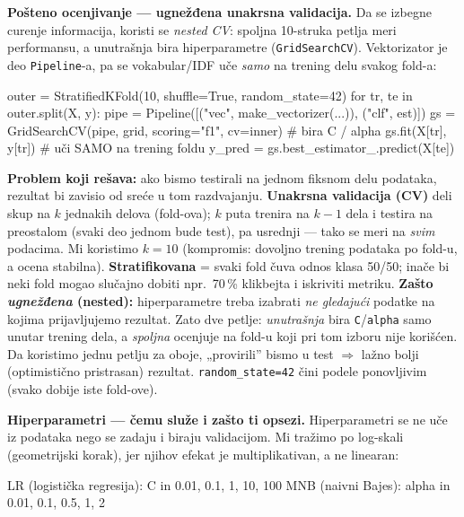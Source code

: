 \documentclass[11pt,a4paper]{article}
\newcommand{\kod}[1]{\texttt{#1}}
\begin{document}
\textbf{Pošteno ocenjivanje --- ugnežđena unakrsna validacija.} Da se izbegne curenje
informacija, koristi se \emph{nested CV}: spoljna 10-struka petlja meri performansu, a
unutrašnja bira hiperparametre (\kod{GridSearchCV}). Vektorizator je deo
\kod{Pipeline}-a, pa se vokabular/IDF uče \emph{samo} na trening delu svakog fold-a:

\begin{code}
outer = StratifiedKFold(10, shuffle=True, random_state=42)
for tr, te in outer.split(X, y):
    pipe = Pipeline([("vec", make_vectorizer(...)), ("clf", est)])
    gs = GridSearchCV(pipe, grid, scoring="f1", cv=inner)   # bira C / alpha
    gs.fit(X[tr], y[tr])                # uči SAMO na trening foldu
    y_pred = gs.best_estimator_.predict(X[te])
\end{code}

\begin{teorija}
\textbf{Problem koji rešava:} ako bismo testirali na jednom fiksnom delu podataka,
rezultat bi zavisio od sreće u tom razdvajanju. \textbf{Unakrsna validacija (CV)} deli
skup na $k$ jednakih delova (fold-ova); $k$ puta trenira na $k\!-\!1$ dela i testira na
preostalom (svaki deo jednom bude test), pa usrednji --- tako se meri na \emph{svim}
podacima. Mi koristimo $k{=}10$ (kompromis: dovoljno trening podataka po fold-u, a
ocena stabilna).
\textbf{Stratifikovana} = svaki fold čuva odnos klasa 50/50; inače bi neki fold mogao
slučajno dobiti npr.\ 70\,\% klikbejta i iskriviti metriku.
\textbf{Zašto \emph{ugnežđena} (nested):} hiperparametre treba izabrati \emph{ne gledajući}
podatke na kojima prijavljujemo rezultat. Zato dve petlje: \emph{unutrašnja} bira
\kod{C}/\kod{alpha} samo unutar trening dela, a \emph{spoljna} ocenjuje na fold-u koji
pri tom izboru nije korišćen. Da koristimo jednu petlju za oboje, „provirili'' bismo u
test $\Rightarrow$ lažno bolji (optimistično pristrasan) rezultat. \kod{random\_state=42}
čini podele ponovljivim (svako dobije iste fold-ove).
\end{teorija}

\textbf{Hiperparametri --- čemu služe i zašto ti opsezi.} Hiperparametri se ne uče iz
podataka nego se zadaju i biraju validacijom. Mi tražimo po log-skali (geometrijski
korak), jer njihov efekat je multiplikativan, a ne linearan:
\begin{code}
LR  (logistička regresija):  C     in {0.01, 0.1, 1, 10, 100}
MNB (naivni Bajes):          alpha in {0.01, 0.1, 0.5, 1, 2}
\end{code}
\end{document}
